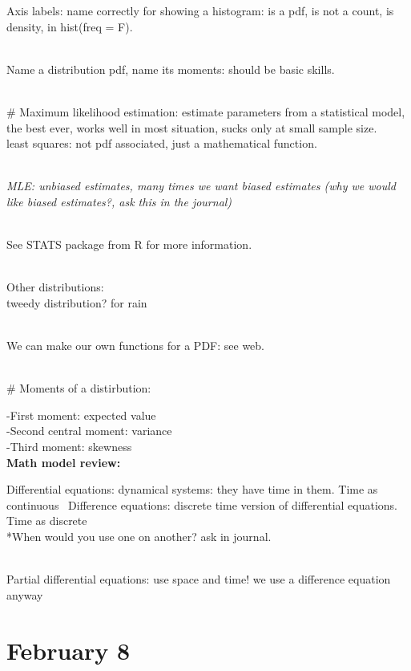 \documentclass[
]{book}
\begin{document}
Axis labels: name correctly for showing a histogram: is a pdf, is not a count, is density, in hist(freq = F).\\
\strut \\
Name a distribution pdf, name its moments: should be basic skills.\\
\strut \\
\# Maximum likelihood estimation: estimate parameters from a statistical model, the best ever, works well in most situation, sucks only at small sample size.\\
least squares: not pdf associated, just a mathematical function.\\
\strut \\
\emph{MLE: unbiased estimates, many times we want biased estimates (why we would like biased estimates?, ask this in the journal)}\\
\strut \\
See STATS package from R for more information.\\
\strut \\
Other distributions:\\
tweedy distribution? for rain\\
\strut \\
We can make our own functions for a PDF: see web.\\
\strut \\
\# Moments of a distirbution:

-First moment: expected value\\
-Second central moment: variance\\
-Third moment: skewness\\

\textbf{Math model review:}

Differential equations: dynamical systems: they have time in them. Time as continuous~
Difference equations: discrete time version of differential equations. Time as discrete\\
*When would you use one on another? ask in journal.\\
\strut \\
Partial differential equations: use space and time! we use a difference equation anyway

\hypertarget{february-8}{%
\section{February 8}\label{february-8}}
\end{document}
